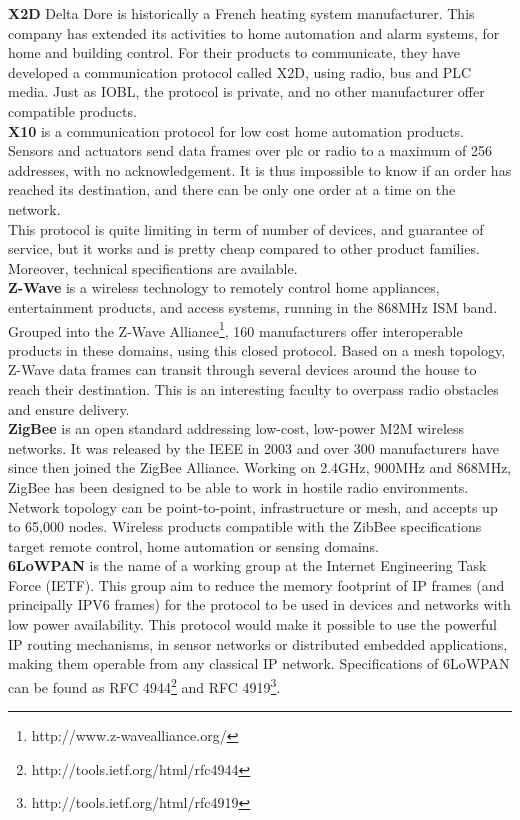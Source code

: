 {\bf X2D} Delta Dore is historically a French heating system manufacturer. This company has extended its activities to home automation and alarm systems, for home and building control. For their products to communicate, they have developed a communication protocol called X2D, using radio, bus and PLC media. Just as IOBL, the protocol is private, and no other manufacturer offer compatible products.\\

{\bf X10} is a communication protocol for low cost home automation products. Sensors and actuators send data frames over \gls{plc} or radio to a maximum of 256 addresses, with no acknowledgement. It is thus impossible to know if an order has reached its destination, and there can be only one order at a time on the network.\\
This protocol is quite limiting in term of number of devices, and guarantee of service, but it works and is pretty cheap compared to other product families. Moreover, technical specifications are available.\\

{\bf Z-Wave} is a wireless technology to remotely control home appliances, entertainment products, and access systems, running in the 868MHz ISM band. Grouped into the Z-Wave Alliance\footnote{http://www.z-wavealliance.org/}, 160 manufacturers offer interoperable products in these domains, using this closed protocol. Based on a mesh topology, Z-Wave data frames can transit through several devices around the house to reach their destination. This is an interesting faculty to overpass radio obstacles and ensure delivery.\\
 
{\bf ZigBee} is an open standard addressing low-cost, low-power M2M wireless networks. It was released by the IEEE in 2003 and over 300 manufacturers have since then joined the ZigBee Alliance. Working on 2.4GHz, 900MHz and 868MHz, ZigBee has been designed to be able to work in hostile radio environments. Network topology can be point-to-point, infrastructure or mesh, and accepts up to 65,000 nodes. Wireless products compatible with the ZibBee specifications target remote control, home automation or sensing domains.\\

{\bf 6LoWPAN} is the name of a working group at the Internet Engineering Task Force (IETF). This group aim to reduce the memory footprint of IP frames (and principally IPV6 frames) for the protocol to be used in devices and networks with low power availability. This protocol would make it possible to use the powerful IP routing mechanisms, in sensor networks or distributed embedded applications, making them operable from any classical IP network. Specifications of 6LoWPAN can be found as RFC 4944\footnote{http://tools.ietf.org/html/rfc4944} and RFC 4919\footnote{http://tools.ietf.org/html/rfc4919}.\\

